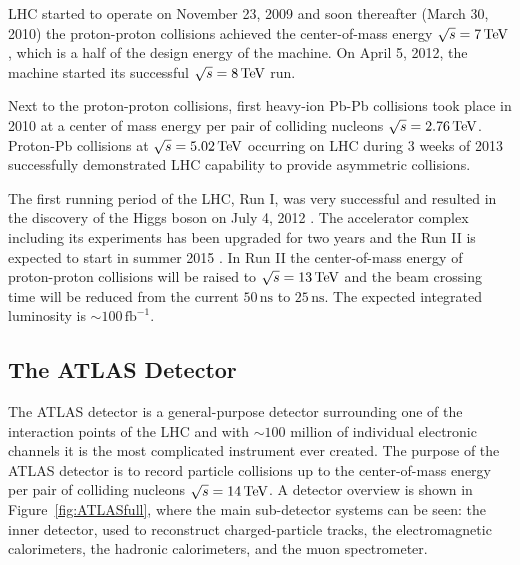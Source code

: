 LHC started to operate on November 23, 2009 and soon thereafter (March 30, 2010)
the proton-proton collisions achieved the center-of-mass energy $\sqrt{s} = 7
\,\text{TeV}$, which is a half of the design energy of the machine. On April 5, 2012, the
machine started its successful $\sqrt{s} = 8 \,\text{TeV}$ run.

Next to the proton-proton collisions, first heavy-ion Pb-Pb collisions took place
in 2010 at a center of mass energy per pair of colliding nucleons $\sqrt{s} =
2.76 \,\text{TeV}$. Proton-Pb collisions at $\sqrt{s} = 5.02 \,\text{TeV}$ occurring on LHC
during 3 weeks of 2013 successfully demonstrated LHC capability to provide
asymmetric collisions.  

The first running period of the LHC, Run I, was very successful and resulted in
the discovery of the Higgs boson on July 4, 2012 \cite{HiggsDiscovery}.  The
accelerator complex including its experiments has been upgraded for two years
and the Run II is expected to start in summer 2015 \cite{LHCFuture,
LHCFutureLuminosigy}. In Run II the center-of-mass energy of proton-proton
collisions will be raised to $\sqrt{s} = 13 \,\text{TeV}$ and the beam crossing time
will be reduced from the current $50\,\text{ns}$ to $25\,\text{ns}$. The
expected integrated luminosity is $\sim 100\,\text{fb}^{-1}$.

\subsection{The ATLAS Detector}

The ATLAS detector \cite{ATLAS} is a general-purpose detector surrounding one of
the interaction points of the LHC and with $\sim 100$ million of individual
electronic channels it is the most complicated instrument ever created.
The purpose of the ATLAS detector is to record particle collisions up to the center-of-mass
energy per pair of colliding nucleons $\sqrt{s} = 14 \,\text{TeV}$. A detector overview is
shown in Figure~\ref{fig:ATLASfull}, where the main sub-detector systems can be
seen: the inner detector, used to reconstruct charged-particle tracks, the
electromagnetic calorimeters, the hadronic calorimeters, and the muon
spectrometer. 

